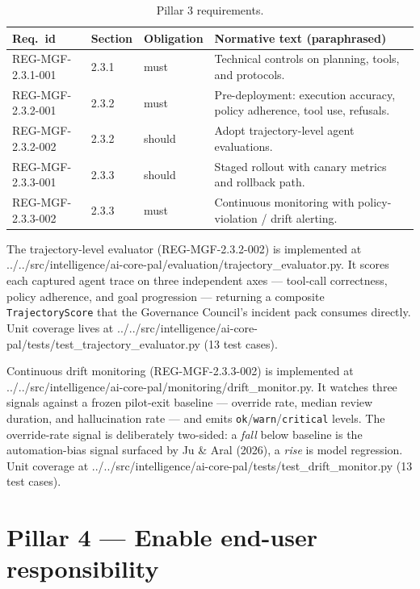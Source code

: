 \documentclass[11pt,a4paper,twoside]{report}
\newcommand{\corpus}{}
\begin{document}
\begin{table}[h]
\centering
\small
\begin{tabularx}{\textwidth}{p{3.2cm}p{1.4cm}p{1.6cm}X}
\toprule
\textbf{Req.\ id} & \textbf{Section} & \textbf{Obligation} & \textbf{Normative text (paraphrased)} \\
\midrule
REG-MGF-2.3.1-001 & 2.3.1 & must   & Technical controls on planning, tools, and protocols. \\
REG-MGF-2.3.2-001 & 2.3.2 & must   & Pre-deployment: execution accuracy, policy adherence, tool use, refusals. \\
REG-MGF-2.3.2-002 & 2.3.2 & should & Adopt trajectory-level agent evaluations. \\
REG-MGF-2.3.3-001 & 2.3.3 & should & Staged rollout with canary metrics and rollback path. \\
REG-MGF-2.3.3-002 & 2.3.3 & must   & Continuous monitoring with policy-violation / drift alerting. \\
\bottomrule
\end{tabularx}
\caption{Pillar 3 requirements.}
\label{tab:p3}
\end{table}

The trajectory-level evaluator (REG-MGF-2.3.2-002) is implemented at
\corpus{../../src/intelligence/ai-core-pal/evaluation/trajectory\_evaluator.py}.
It scores each captured agent trace on three independent axes ---
tool-call correctness, policy adherence, and goal progression ---
returning a composite \texttt{TrajectoryScore} that the Governance
Council's incident pack consumes directly. Unit coverage lives at
\corpus{../../src/intelligence/ai-core-pal/tests/test\_trajectory\_evaluator.py}
(13 test cases).

Continuous drift monitoring (REG-MGF-2.3.3-002) is implemented at
\corpus{../../src/intelligence/ai-core-pal/monitoring/drift\_monitor.py}.
It watches three signals against a frozen pilot-exit baseline ---
override rate, median review duration, and hallucination rate --- and
emits \texttt{ok}/\texttt{warn}/\texttt{critical} levels. The
override-rate signal is deliberately two-sided: a \emph{fall} below
baseline is the automation-bias signal surfaced by Ju \& Aral (2026),
a \emph{rise} is model regression. Unit coverage at
\corpus{../../src/intelligence/ai-core-pal/tests/test\_drift\_monitor.py}
(13 test cases).

\section{Pillar 4 --- Enable end-user responsibility}
\label{sec:mgf-p4}
\end{document}
